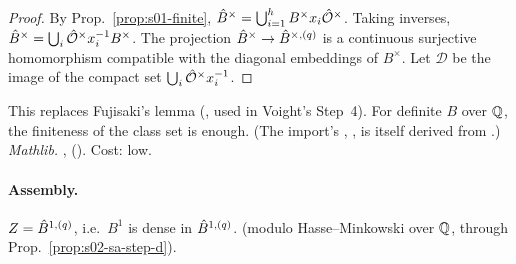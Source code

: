 \begin{proof}
By Prop.~\ref{prop:s01-finite}, $\hat{B}^\times=\bigcup_{i=1}^hB^\times x_i\hat{\mathcal{O}}^\times$. Taking inverses,
$\hat{B}^\times=\bigcup_i\hat{\mathcal{O}}^\times x_i^{-1}B^\times$. The projection $\hat{B}^\times\to\hat{B}^{\times,(q)}$ is a continuous surjective
homomorphism compatible with the diagonal embeddings of $B^\times$. Let $\mathcal D$ be the image of the compact set
$\bigcup_i\hat{\mathcal{O}}^\times x_i^{-1}$.
\end{proof}

\noindent This replaces Fujisaki's lemma (, used in Voight's
Step~4). For definite $B$ over $\mathbb{Q}$, the finiteness of the class set is enough. (The import's ,
, is itself derived from .) \emph{Mathlib.}
,  (). Cost: low.

\paragraph{Assembly.}

\begin{theorem}\label{thm:s02-sa-main}
$Z=\hat{B}^{1,(q)}$, i.e.\ $B^1$ is dense in $\hat{B}^{1,(q)}$.
\stpmc{} (modulo Hasse--Minkowski over $\mathbb{Q}$, through Prop.~\ref{prop:s02-sa-step-d}).
\end{theorem}

